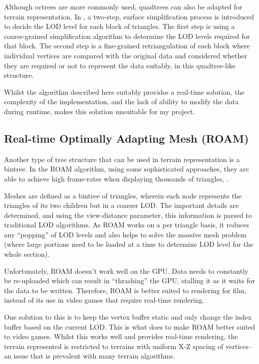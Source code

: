\documentclass[notitlepage,12pt]{article}
\begin{document}
Although octrees are more commonly used, quadtrees can also be adapted for terrain representation. In \cite{quadtrees}, a two-step, surface simplification process is introduced to decide the LOD level for each block of triangles. The first step is using a coarse-grained simplification algorithm to determine the LOD levels required for that block. The second step is a fine-grained retriangulation of each block where individual vertices are compared with the original data and considered whether they are required or not to represent the data suitably, in this quadtree-like structure.

Whilst the algorithm described here suitably provides a real-time solution, the complexity of the implementation, and the lack of ability to modify the data during runtime, makes this solution unsuitable for my project.

\subsection{Real-time Optimally Adapting Mesh (ROAM)}

Another type of tree structure that can be used in terrain representation is a bintree. In the ROAM algorithm, using some sophisticated approaches, they are able to achieve high frame-rates when displaying thousands of triangles, \cite{roam}. 

Meshes are defined as a bintree of triangles, wherein each node represents the triangles of its two children but in a coarser LOD. The important details are determined, and using the view-distance parameter, this information is parsed to traditional LOD algorithms. As ROAM works on a per triangle basis, it reduces any ``popping'' of LOD levels and also helps to solve the massive mesh problem (where large portions need to be loaded at a time to determine LOD level for the whole section).

Unfortunately, ROAM doesn't work well on the GPU. Data needs to constantly be re-uploaded which can result in ``thrashing'' the GPU, stalling it as it waits for the data to be written. Therefore, ROAM is better suited to rendering for film, instead of its use in video games that require real-time rendering.

One solution to this is to keep the vertex buffer static and only change the index buffer based on the current LOD. This is what \cite{roamGeomancy} does to make ROAM better suited to video games. Whilst this works well and provides real-time rendering, the terrain represented is restricted to terrains with uniform X-Z spacing of vertices--an issue that is prevalent with many terrain algorithms.
\end{document}
